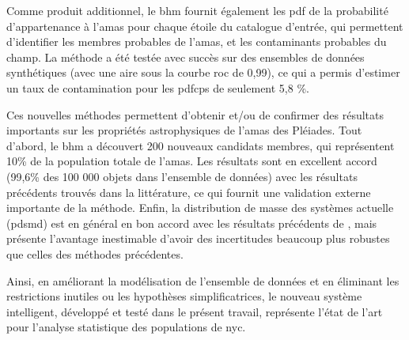 Comme produit additionnel, le \gls{bhm} fournit également les \gls{pdf} de la probabilité d'appartenance à l'amas pour chaque étoile du catalogue d'entrée, qui permettent d'identifier les membres probables de l'amas, et les contaminants probables du champ. La méthode a été testée avec succès sur des ensembles de données synthétiques (avec une aire sous la courbe \gls{roc} de 0,99), ce qui a permis d'estimer un taux de contamination pour les \glspl{pdfcp} de seulement 5,8 \%.

Ces nouvelles méthodes permettent d'obtenir et/ou de confirmer des résultats importants sur les propriétés astrophysiques de l'amas des Pléiades. Tout d'abord, le \gls{bhm} a découvert 200 nouveaux candidats membres, qui représentent 10\% de la population totale de l'amas. Les résultats sont en excellent accord (99,6\% des 100 000 objets dans l'ensemble de données) avec les résultats précédents trouvés dans la littérature, ce qui fournit une validation externe importante de la méthode. Enfin, la distribution de masse des systèmes actuelle (\gls{pdsmd}) est en général en bon accord avec les résultats précédents de \citet{Bouy2015}, mais présente l'avantage inestimable d'avoir des incertitudes beaucoup plus robustes que celles des méthodes précédentes.

Ainsi, en améliorant la modélisation de l'ensemble de données et en éliminant les restrictions inutiles ou les hypothèses simplificatrices, le nouveau système intelligent, développé et testé dans le présent travail, représente l'état de l'art pour l'analyse statistique des populations de \gls{nyc}.
